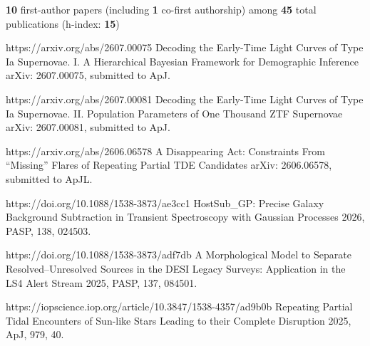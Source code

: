


\begin{cvpubs}

\cvpub
{ %
{\bf 10} first-author papers (including {\bf 1} co-first authorship) among {\bf 45} total publications (h-index: {\bf 15})
}


\cvpub
{ %
{}
}

\begin{cvpubitems}

{}
{https://arxiv.org/abs/2607.00075}
{Decoding the Early-Time Light Curves of Type Ia Supernovae. I. A Hierarchical Bayesian Framework for Demographic Inference}
{arXiv: 2607.00075, submitted to ApJ.}

{}
{https://arxiv.org/abs/2607.00081}
{Decoding the Early-Time Light Curves of Type Ia Supernovae. II. Population Parameters of One Thousand ZTF Supernovae}
{arXiv: 2607.00081, submitted to ApJ.}

{}
{https://arxiv.org/abs/2606.06578}
{A Disappearing Act: Constraints From ``Missing'' Flares of Repeating Partial TDE Candidates}
{arXiv: 2606.06578, submitted to ApJL.}

{}
{https://doi.org/10.1088/1538-3873/ae3cc1}
{HostSub\_GP: Precise Galaxy Background Subtraction in Transient Spectroscopy with Gaussian Processes}
{2026, PASP, 138, 024503.}

{}
{https://doi.org/10.1088/1538-3873/adf7db}
{A Morphological Model to Separate Resolved--Unresolved Sources in the DESI Legacy Surveys: Application in the LS4 Alert Stream}
{2025, PASP, 137, 084501.}

{}
{https://iopscience.iop.org/article/10.3847/1538-4357/ad9b0b}
{Repeating Partial Tidal Encounters of Sun-like Stars Leading to their Complete Disruption}
{2025, ApJ, 979, 40.}


\end{cvpubitems}
\end{cvpubs}
